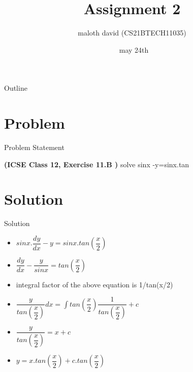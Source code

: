 \documentclass{beamer}
\title{Assignment 2}
\author{maloth david (CS21BTECH11035)}
\date{\ may 24th}
\begin{document}
\begin{frame}
    \titlepage 
\end{frame}

\begin{frame}{Outline}
    \tableofcontents
\end{frame}


\section{Problem}
\begin{frame}{Problem Statement}

\textbf{(ICSE Class 12, Exercise 11.B )}
solve sinx -y=sinx.tan
\end{frame}


\section{Solution}
\begin{frame}{Solution}

\begin{itemize}

\item $sinx.\dfrac {dy}{dx}-y =sinx.tan(\dfrac{x}{2}) $ \\
\item $\dfrac{dy}{dx}-\dfrac{y}{sinx}=tan(\dfrac{x}{2})$ \\
\item  integral  factor of the above equation is 1/tan(x/2)\\
\item $\dfrac{y}{tan(\dfrac{x}{2})}dx = $$\int$$ 
 tan(\dfrac{x}{2})\dfrac{1}{tan(\dfrac{x}{2})} + c $\\
\item $\dfrac{y}{tan(\dfrac{x}{2})} = x+c $\\
\item $ y = x.tan(\dfrac {x}{2})  + c.tan(\dfrac{x}{2}) $
\end{itemize}
    
    
\end{frame} 
\end{document}
